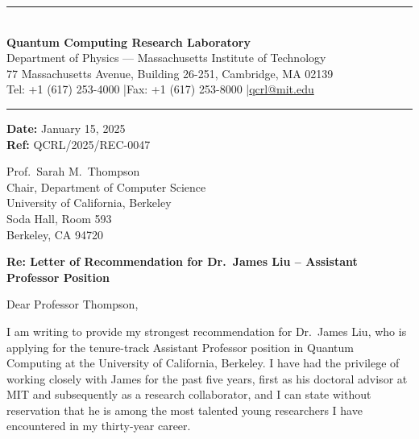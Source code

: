 \documentclass[12pt,a4paper]{article}
\begin{document}
\begin{center}
{\color{headercolor}\rule{\textwidth}{2pt}}\\[12pt]
{\fontsize{20}{24}\selectfont\bfseries\color{headercolor} Quantum Computing Research Laboratory}\\[4pt]
{\large Department of Physics --- Massachusetts Institute of Technology}\\[4pt]
{\small 77 Massachusetts Avenue, Building 26-251, Cambridge, MA 02139}\\[2pt]
{\small Tel: +1 (617) 253-4000 \quad|\quad Fax: +1 (617) 253-8000 \quad|\quad \href{mailto:qcrl@mit.edu}{qcrl@mit.edu}}\\[8pt]
{\color{headercolor}\rule{\textwidth}{0.5pt}}
\end{center}

\vspace{1cm}

\begin{flushright}
\textbf{Date:} January 15, 2025\\
\textbf{Ref:} QCRL/2025/REC-0047
\end{flushright}

\vspace{0.5cm}

Prof.\ Sarah M.\ Thompson\\
Chair, Department of Computer Science\\
University of California, Berkeley\\
Soda Hall, Room 593\\
Berkeley, CA 94720

\vspace{0.5cm}

\textbf{Re: Letter of Recommendation for Dr.\ James Liu -- Assistant Professor Position}

\vspace{0.3cm}

Dear Professor Thompson,

I am writing to provide my strongest recommendation for Dr.\ James Liu, who is applying for the tenure-track Assistant Professor position in Quantum Computing at the University of California, Berkeley. I have had the privilege of working closely with James for the past five years, first as his doctoral advisor at MIT and subsequently as a research collaborator, and I can state without reservation that he is among the most talented young researchers I have encountered in my thirty-year career.
\end{document}
